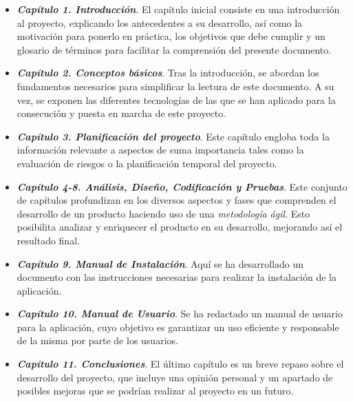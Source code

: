 \begin{itemize}
    \item \textbf{\emph{Capítulo 1. Introducción}}. El capítulo inicial 
    consiste en una introducción al proyecto, explicando los antecedentes 
    a su desarrollo, así como la motivación para ponerlo en práctica, los 
    objetivos que debe cumplir y un glosario de términos para facilitar 
    la comprensión del presente documento.

    \item \textbf{\emph{Capítulo 2. Conceptos básicos}}. Tras la introducción,
    se abordan los fundamentos necesarios para simplificar la lectura de 
    este documento. A su vez, se exponen las diferentes tecnologías de las 
    que se han aplicado para la consecución y puesta en marcha de este 
    proyecto.

    \item \textbf{\emph{Capítulo 3. Planificación del proyecto}}. Este 
    capítulo engloba toda la información relevante a aspectos de 
    suma importancia tales como la evaluación de riesgos o la planificación 
    temporal del proyecto.

    \item \textbf{\emph{Capítulo 4-\@8. Análisis, Diseño, Codificación y 
    Pruebas}}. Este conjunto de capítulos profundizan en los diversos 
    aspectos y fases que comprenden el desarrollo de un producto haciendo 
    uso de una \emph{metodología ágil}. Esto posibilita analizar y 
    enriquecer el producto en su desarrollo, mejorando así el resultado 
    final.

    \item \textbf{\emph{Capítulo 9. Manual de Instalación}}. Aquí se 
    ha desarrollado un documento con las instrucciones necesarias 
    para realizar la instalación de la aplicación.

    \item \textbf{\emph{Capítulo 10. Manual de Usuario}}. Se ha redactado 
    un manual de usuario para la aplicación, cuyo objetivo es garantizar un 
    uso eficiente y responsable de la misma por parte de los usuarios. 
    
    \item \textbf{\emph{Capítulo 11. Conclusiones}}. El último capítulo es 
    un breve repaso sobre el desarrollo del proyecto, que incluye una 
    opinión personal y un apartado de posibles mejoras que se podrían 
    realizar al proyecto en un futuro.


\end{itemize}








